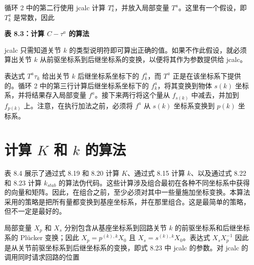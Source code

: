 \documentclass[10pt,a4paper]{book}
\theoremstyle{thmstyle} %
\theoremstyle{defstyle} %
\theoremstyle{prostyle} %
\begin{document}
循环 2 中的第二行使用 jcalc 计算 $T_{k}^{a}$，并放入局部变量 $T^{a}$。这里有一个假设，即 $T_{k}^{a}$ 是常数，因此



\noindent\textbf{表 8.3：计算 $C - \tau^{a}$ 的算法}





jcalc 只需知道关节 $k$ 的类型说明符即可算出正确的值。如果不作此假设，就必须算出关节 $k$ 从前驱坐标系到后继坐标系的变换，以便将其作为参数提供给 jcalc。



表达式 $T^{a}\tau_{k}$ 给出关节 $k$ 后继坐标系坐标下的 $f_{k}^{a}$，而 $T^{a}$ 正是在该坐标系下提供的。循环 2 中的第三行计算后继坐标系坐标下的 $f_{k}^{a}$，将其变换到物体 $s(k)$ 坐标系，并将结果存入局部变量 $f^{a}$。接下来两行将这个量从 $f_{s(k)}$ 中减去，并加到 $f_{p(k)}$ 上。注意，在执行加法之前，必须将 $f^{a}$ 从 $s(k)$ 坐标系变换到 $p(k)$ 坐标系。



\section{计算 $K$ 和 $k$ 的算法}





表 8.4 展示了通过式 8.19 和 8.20 计算 $K$、通过式 8.15 计算 $k$、以及通过式 8.22 和 8.23 计算 $k_{stab}$ 的算法伪代码。这些计算涉及组合最初在各种不同坐标系中获得的向量和矩阵。因此，在组合之前，至少必须对其中一些量施加坐标变换。本算法采用的策略是把所有量都变换到基座坐标系，并在那里组合。这是最简单的策略，但不一定是最好的。



局部变量 $X_{p}$ 和 $X_{s}$ 分别包含从基座坐标系到回路关节 $k$ 的前驱坐标系和后继坐标系的 Plücker 变换；因此 $X_{p} = p^{(k),k}X_{0}$ 且 $X_{s} = s^{(k),k}X_{0}$。表达式 $X_{s}X_{p}^{-1}$ 因此是从关节前驱坐标系到后继坐标系的变换，即式 8.23 中 jcalc 的参数。对 jcalc 的调用同时请求回路的位置
\end{document}
